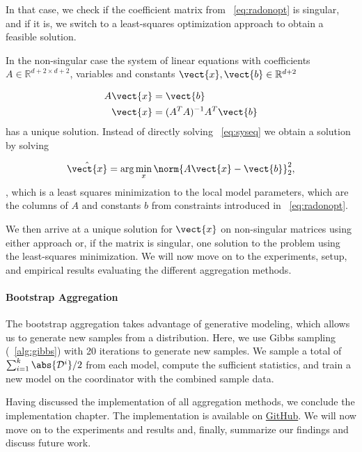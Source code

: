In that case, we check if the coefficient matrix from \eq~\ref{eq:radonopt} is singular, and if it is, we switch to a least-squares optimization approach to obtain a feasible solution. 

In the non-singular case the system of linear equations with coefficients $A \in \mathbb{R}^{d+2 \times d+2}$, variables and constants $\vect{x}, \vect{b} \in \mathbb{R}^{d+2}$

\begin{equation}
    \label{eq:syseq}
    \begin{split}
        A\vect{x} &= \vect{b} \\
        \vect{x} &= (A^TA)^{-1}A^T \vect{b}
    \end{split}
\end{equation}
has a unique solution.
Instead of directly solving \eq~\ref{eq:syseq} we obtain a solution by solving 

\begin{equation}
    \hat{\vect{x}} = \arg\min_{x} \norm{A\vect{x} - \vect{b}}^2_2,
\end{equation}
, which is a least squares minimization \wrt to the local model parameters, which are the columns of $A$ and constants $b$ from constraints introduced in \eq~\ref{eq:radonopt}.

We then arrive at a unique solution for $\vect{x}$ on non-singular matrices using either approach or, if the matrix is singular, one solution to the problem using the least-squares minimization.
We will now move on to the experiments, setup, and empirical results evaluating the different aggregation methods.


\paragraph*{Bootstrap Aggregation}

The bootstrap aggregation takes advantage of generative modeling, which allows us to generate new samples from a distribution.
Here, we use Gibbs sampling (\alg~\ref{alg:gibbs}) with 20 iterations to generate new samples.
We sample a total of $\sum_{i=1}^k \abs{\mathcal{D}^i} /2$ from each model, compute the sufficient statistics, and train a new model on the coordinator with the combined sample data.

Having discussed the implementation of all aggregation methods, we conclude the implementation chapter.
The implementation is available on \href{https://github.com/Xst4r/Distributed-PGM/tree/master/Code}{GitHub}.
We will now move on to the experiments and results and, finally, summarize our findings and discuss future work.